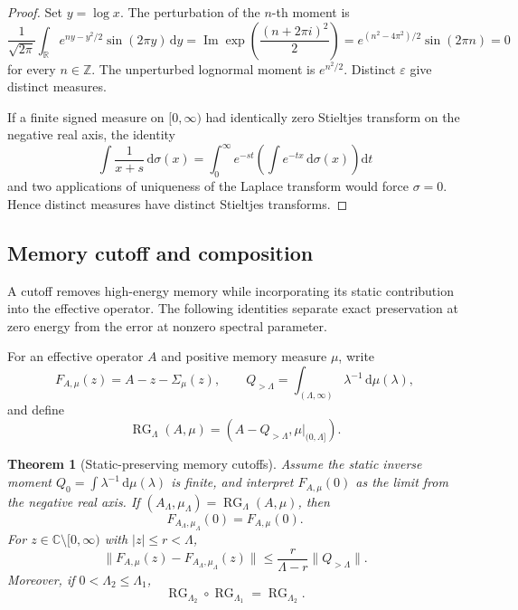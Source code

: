 \documentclass[11pt]{article}
\newtheorem{theorem}{Theorem}[section]
\theoremstyle{definition}
\theoremstyle{remark}
\theoremstyle{definition}
\theoremstyle{remark}
\newcommand{\dd}{\mathrm d}
\newcommand{\RG}{\operatorname{RG}}
\begin{document}
\begin{proof}
Set $y=\log x$.  The perturbation of the $n$-th moment is
\[
 \frac1{\sqrt{2\pi}}
 \int_\mathbb R
 e^{ny-y^2/2}\sin(2\pi y)\,\dd y
 =
 \operatorname{Im}
 \exp\!\left(\frac{(n+2\pi i)^2}{2}\right)
 =
 e^{(n^2-4\pi^2)/2}\sin(2\pi n)=0
\]
for every $n\in\mathbb Z$.  The unperturbed lognormal moment is
$e^{n^2/2}$.  Distinct $\varepsilon$ give distinct measures.

If a finite signed measure on $[0,\infty)$ had identically zero Stieltjes
transform on the negative real axis, the identity
\[
 \int\frac{1}{x+s}\,\dd\sigma(x)
 =
 \int_0^\infty e^{-st}
 \left(\int e^{-tx}\,\dd\sigma(x)\right)\dd t
\]
and two applications of uniqueness of the Laplace transform would force
$\sigma=0$.  Hence distinct measures have distinct Stieltjes transforms.
\end{proof}

\subsection{Memory cutoff and composition}

A cutoff removes high-energy memory while incorporating its static
contribution into the effective operator.  The following identities
separate exact preservation at zero energy from the error at nonzero
spectral parameter.

For an effective operator $A$ and positive memory measure $\mu$, write
\begin{equation}
F_{A,\mu}(z)=A-z-\Sigma_\mu(z),
\qquad
Q_{>\Lambda}=\int_{(\Lambda,\infty)}\lambda^{-1}\,\dd\mu(\lambda),
\label{eq:supp-memory-head}
\end{equation}
and define
\begin{equation}
\RG_\Lambda(A,\mu)
=\left(A-Q_{>\Lambda},\mu|_{(0,\Lambda]}\right).
\label{eq:supp-memory-RG}
\end{equation}

\begin{theorem}[Static-preserving memory cutoffs]
\label{thm:supp-memory-RG}
Assume the static inverse moment
$Q_0=\int\lambda^{-1}\,\dd\mu(\lambda)$ is finite, and interpret $F_{A,\mu}(0)$
as the limit from the negative real axis.  If
$(A_\Lambda,\mu_\Lambda)=\RG_\Lambda(A,\mu)$, then
\begin{equation}
{F_{A_\Lambda,\mu_\Lambda}(0)=F_{A,\mu}(0).}
\label{eq:supp-memory-static-preserved}
\end{equation}
For $z\in\mathbb C\setminus[0,\infty)$ with $|z|\le r<\Lambda$,
\begin{equation}
{
\|F_{A,\mu}(z)-F_{A_\Lambda,\mu_\Lambda}(z)\|
\le\frac r{\Lambda-r}\|Q_{>\Lambda}\|.}
\label{eq:memory-cutoff-error}
\end{equation}
Moreover, if $0<\Lambda_2\le\Lambda_1$,
\begin{equation}
\RG_{\Lambda_2}\circ\RG_{\Lambda_1}=\RG_{\Lambda_2}.
\label{eq:supp-memory-semigroup}
\end{equation}
\end{theorem}
\end{document}
